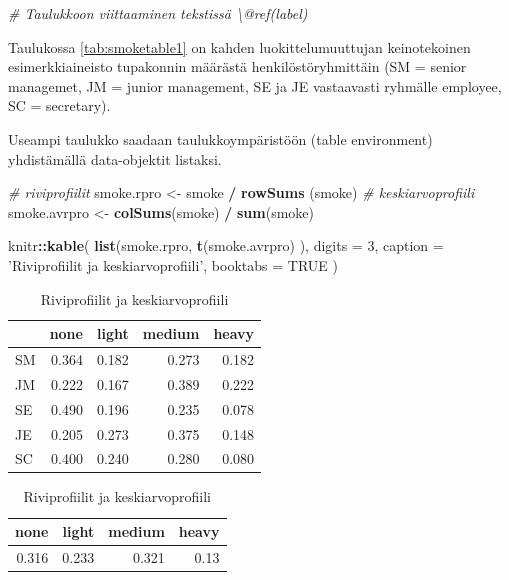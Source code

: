 \documentclass[
  finnish,
]{book}
\newenvironment{Shaded}{\begin{snugshade}}{\end{snugshade}}
\newcommand{\CommentTok}[1]{\textcolor[rgb]{0.56,0.35,0.01}{\textit{#1}}}
\newcommand{\DataTypeTok}[1]{\textcolor[rgb]{0.13,0.29,0.53}{#1}}
\newcommand{\DecValTok}[1]{\textcolor[rgb]{0.00,0.00,0.81}{#1}}
\newcommand{\KeywordTok}[1]{\textcolor[rgb]{0.13,0.29,0.53}{\textbf{#1}}}
\newcommand{\NormalTok}[1]{#1}
\newcommand{\OperatorTok}[1]{\textcolor[rgb]{0.81,0.36,0.00}{\textbf{#1}}}
\newcommand{\OtherTok}[1]{\textcolor[rgb]{0.56,0.35,0.01}{#1}}
\newcommand{\StringTok}[1]{\textcolor[rgb]{0.31,0.60,0.02}{#1}}
\begin{document}
\begin{Shaded}
\begin{Highlighting}[]
\CommentTok{# Taulukkoon viittaaminen tekstissä \textbackslash{}@ref(label)}
\end{Highlighting}
\end{Shaded}

Taulukossa \ref{tab:smoketable1} on kahden luokittelumuuttujan keinotekoinen esimerkkiaineisto tupakonnin määrästä henkilöstöryhmittäin (SM = senior managemet, JM = junior management, SE ja JE vastaavasti ryhmälle employee, SC = secretary).

Useampi taulukko saadaan taulukkoympäristöön (table environment) yhdistämällä data-objektit listaksi.

\begin{Shaded}
\begin{Highlighting}[]
\CommentTok{# riviprofiilit}
\NormalTok{smoke.rpro <-}\StringTok{ }\NormalTok{smoke }\OperatorTok{/}\StringTok{ }\KeywordTok{rowSums}\NormalTok{ (smoke)}
\CommentTok{# keskiarvoprofiili}
\NormalTok{smoke.avrpro <-}\StringTok{ }\KeywordTok{colSums}\NormalTok{(smoke) }\OperatorTok{/}\StringTok{ }\KeywordTok{sum}\NormalTok{(smoke)}

\NormalTok{knitr}\OperatorTok{::}\KeywordTok{kable}\NormalTok{(}
  \KeywordTok{list}\NormalTok{(smoke.rpro, }\KeywordTok{t}\NormalTok{(smoke.avrpro)   ), }\DataTypeTok{digits =} \DecValTok{3}\NormalTok{,}
  \DataTypeTok{caption =} \StringTok{'Riviprofiilit ja keskiarvoprofiili'}\NormalTok{, }\DataTypeTok{booktabs =} \OtherTok{TRUE}
\NormalTok{)}
\end{Highlighting}
\end{Shaded}

\begin{table}
\caption{\label{tab:smoketable2}Riviprofiilit ja keskiarvoprofiili}

\centering
\begin{tabular}[t]{lrrrr}
\toprule
  & none & light & medium & heavy\\
\midrule
SM & 0.364 & 0.182 & 0.273 & 0.182\\
JM & 0.222 & 0.167 & 0.389 & 0.222\\
SE & 0.490 & 0.196 & 0.235 & 0.078\\
JE & 0.205 & 0.273 & 0.375 & 0.148\\
SC & 0.400 & 0.240 & 0.280 & 0.080\\
\bottomrule
\end{tabular}
\centering
\begin{tabular}[t]{rrrr}
\toprule
none & light & medium & heavy\\
\midrule
0.316 & 0.233 & 0.321 & 0.13\\
\bottomrule
\end{tabular}
\end{table}
\end{document}
